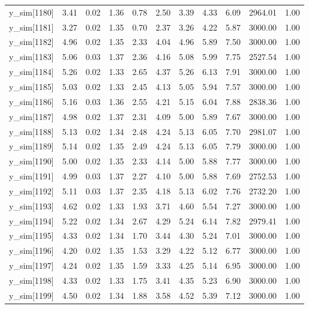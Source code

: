 \begin{table}[ht]
\begin{tabular}{rrrrrrrrrrr}
  y\_sim[1180] & 3.41 & 0.02 & 1.36 & 0.78 & 2.50 & 3.39 & 4.33 & 6.09 & 2964.01 & 1.00 \\ 
  y\_sim[1181] & 3.27 & 0.02 & 1.35 & 0.70 & 2.37 & 3.26 & 4.22 & 5.87 & 3000.00 & 1.00 \\ 
  y\_sim[1182] & 4.96 & 0.02 & 1.35 & 2.33 & 4.04 & 4.96 & 5.89 & 7.50 & 3000.00 & 1.00 \\ 
  y\_sim[1183] & 5.06 & 0.03 & 1.37 & 2.36 & 4.16 & 5.08 & 5.99 & 7.75 & 2527.54 & 1.00 \\ 
  y\_sim[1184] & 5.26 & 0.02 & 1.33 & 2.65 & 4.37 & 5.26 & 6.13 & 7.91 & 3000.00 & 1.00 \\ 
  y\_sim[1185] & 5.03 & 0.02 & 1.33 & 2.45 & 4.13 & 5.05 & 5.94 & 7.57 & 3000.00 & 1.00 \\ 
  y\_sim[1186] & 5.16 & 0.03 & 1.36 & 2.55 & 4.21 & 5.15 & 6.04 & 7.88 & 2838.36 & 1.00 \\ 
  y\_sim[1187] & 4.98 & 0.02 & 1.37 & 2.31 & 4.09 & 5.00 & 5.89 & 7.67 & 3000.00 & 1.00 \\ 
  y\_sim[1188] & 5.13 & 0.02 & 1.34 & 2.48 & 4.24 & 5.13 & 6.05 & 7.70 & 2981.07 & 1.00 \\ 
  y\_sim[1189] & 5.14 & 0.02 & 1.35 & 2.49 & 4.24 & 5.13 & 6.05 & 7.79 & 3000.00 & 1.00 \\ 
  y\_sim[1190] & 5.00 & 0.02 & 1.35 & 2.33 & 4.14 & 5.00 & 5.88 & 7.77 & 3000.00 & 1.00 \\ 
  y\_sim[1191] & 4.99 & 0.03 & 1.37 & 2.27 & 4.10 & 5.00 & 5.88 & 7.69 & 2752.53 & 1.00 \\ 
  y\_sim[1192] & 5.11 & 0.03 & 1.37 & 2.35 & 4.18 & 5.13 & 6.02 & 7.76 & 2732.20 & 1.00 \\ 
  y\_sim[1193] & 4.62 & 0.02 & 1.33 & 1.93 & 3.71 & 4.60 & 5.54 & 7.27 & 3000.00 & 1.00 \\ 
  y\_sim[1194] & 5.22 & 0.02 & 1.34 & 2.67 & 4.29 & 5.24 & 6.14 & 7.82 & 2979.41 & 1.00 \\ 
  y\_sim[1195] & 4.33 & 0.02 & 1.34 & 1.70 & 3.44 & 4.30 & 5.24 & 7.01 & 3000.00 & 1.00 \\ 
  y\_sim[1196] & 4.20 & 0.02 & 1.35 & 1.53 & 3.29 & 4.22 & 5.12 & 6.77 & 3000.00 & 1.00 \\ 
  y\_sim[1197] & 4.24 & 0.02 & 1.35 & 1.59 & 3.33 & 4.25 & 5.14 & 6.95 & 3000.00 & 1.00 \\ 
  y\_sim[1198] & 4.33 & 0.02 & 1.33 & 1.75 & 3.41 & 4.35 & 5.23 & 6.90 & 3000.00 & 1.00 \\ 
  y\_sim[1199] & 4.50 & 0.02 & 1.34 & 1.88 & 3.58 & 4.52 & 5.39 & 7.12 & 3000.00 & 1.00 \\ 

\end{tabular}
\end{table}
